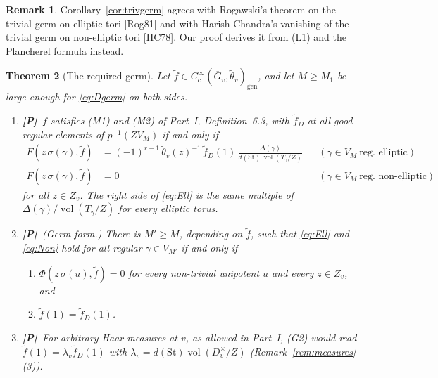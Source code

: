 \documentclass[12pt]{article}
\newcommand{\ov}[1]{\overline{#1}}
\newcommand{\gen}{\mathrm{gen}}
\newcommand{\vol}{\operatorname{vol}}
\newcommand{\St}{\mathrm{St}}
\newcommand{\Gb}{\ov{G}}
\newcommand{\Zb}{\ov{Z}}
\newcommand{\sg}{\sigma}
\newcommand{\Pv}{\textbf{[P]}}
\theoremstyle{plain}
\newtheorem{theorem}{Theorem}[section]
\theoremstyle{definition}
\newtheorem{remark}[theorem]{Remark}
\begin{document}
\begin{remark}
Corollary~\ref{cor:trivgerm} agrees with Rogawski's theorem on the trivial germ on elliptic tori [Rog81] and with Harish-Chandra's vanishing of the trivial germ on non-elliptic tori [HC78]. Our proof derives it from (L1) and the Plancherel formula instead.
\end{remark}

\begin{theorem}[The required germ]\label{thm:germ}
Let $\tilde f\in C_c^\infty(\Gb_v,\tilde\theta_v)_\gen$, and let $M\ge M_1$ be large enough for \eqref{eq:Dgerm} on both sides.
\begin{enumerate}[label=(\alph*)]
\item \Pv\ $\tilde f$ satisfies (M1) and (M2) of Part~I, Definition~6.3, with $\tilde f_D$ at all good regular elements of $p^{-1}(ZV_M)$ if and only if
\begin{align}
F(z\,\sg(\gamma),\tilde f)&=(-1)^{r-1}\,\tilde\theta_v(z)^{-1}\,\tilde f_D(1)\,\frac{\Delta(\gamma)}{d(\St)\,\vol(T_\gamma/Z)}&&(\gamma\in V_M\ \text{reg.\ elliptic}),\tag{Ell}\label{eq:Ell}\\
F(z\,\sg(\gamma),\tilde f)&=0&&(\gamma\in V_M\ \text{reg.\ non-elliptic}),\tag{Non}\label{eq:Non}
\end{align}
for all $z\in\Zb_v$. The right side of \eqref{eq:Ell} is the same multiple of $\Delta(\gamma)/\vol(T_\gamma/Z)$ for every elliptic torus.
\item \Pv\ (Germ form.) There is $M'\ge M$, depending on $\tilde f$, such that \eqref{eq:Ell} and \eqref{eq:Non} hold for all regular $\gamma\in V_{M'}$ if and only if
\begin{enumerate}[label=(G\arabic*)]
\item $\Phi(z\,\sg(u),\tilde f)=0$ for every non-trivial unipotent $u$ and every $z\in\Zb_v$, and
\item $\tilde f(1)=\tilde f_D(1)$.
\end{enumerate}
\item \Pv\ For arbitrary Haar measures at $v$, as allowed in Part~I, (G2) would read $\tilde f(1)=\lambda_v\tilde f_D(1)$ with $\lambda_v=d(\St)\vol(D_v^\times/Z)$ (Remark~\ref{rem:measures}(3)).
\end{enumerate}
\end{theorem}
\end{document}
